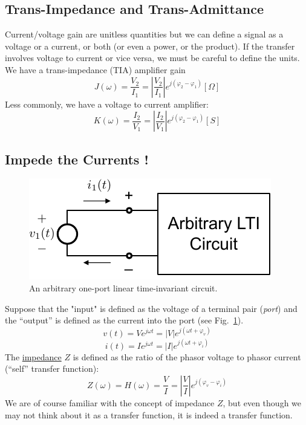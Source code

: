
\subsection{Trans-Impedance and Trans-Admittance}


Current/voltage gain are unitless quantities but we can define a signal as a voltage or a current, or both (or even a power, or the product).   If the transfer involves voltage to current or vice versa, we must be careful to define the units.  We have a trans-impedance (TIA) amplifier gain
\begin{equation}
J(\omega ) = \frac{{{V_2}}}{{{I_1}}} = \left| {\frac{{{V_2}}}{{{I_1}}}} \right|{e^{j({\varphi _2} - {\varphi _1})}}  [\Omega ]
\end{equation}
Less commonly, we have a voltage to current amplifier:
\begin{equation}
K(\omega ) = \frac{{{I_2}}}{{{V_1}}} = \left| {\frac{{{I_2}}}{{{V_1}}}} \right|{e^{j({\varphi _2} - {\varphi _1})}}  [S]
\end{equation}

 

\subsection{Impede the Currents !}
 
 
 
 \begin{figure}[tb]
\begin{center}
\includegraphics[width=.5\columnwidth]{mod1_3_2_oneport}
\end{center}
\caption{An arbitrary one-port linear time-invariant circuit.} \label{fig:oneport}
\end{figure}

Suppose that the "input" is defined as the voltage of a terminal pair (\textit{port}) and the “output” is defined as the current into the port (see Fig.~\ref{fig:oneport}).  
\begin{equation}
v(t) = V{e^{j\omega t}} = \left| V \right|{e^{j(\omega t + {\varphi _v})}}
\end{equation}
\begin{equation}
i(t) = I{e^{j\omega t}} = \left| I \right|{e^{j(\omega t + {\varphi _i})}}
\end{equation}
The \underline{impedance} $Z$  is defined as the ratio of the phasor voltage to phasor current (“self” transfer function):
\begin{equation}
Z(\omega ) = H(\omega ) = \frac{V}{I} = \left| {\frac{V}{I}} \right|{e^{j({\varphi _v} - {\varphi _i})}}
\end{equation}
We are of course familiar with the concept of impedance $Z$, but even though we may not think about it as a transfer function, it is indeed a transfer function.


